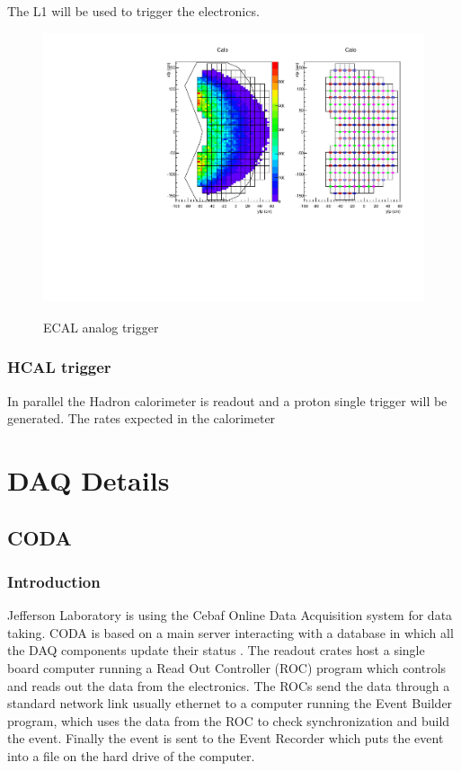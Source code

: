 \documentclass{article}
\begin{document}
The L1 will be used to trigger the  electronics.

\begin{figure}
  \centering
  \includegraphics[width=\textwidth]{figs/cfpa.pdf}\\
  \caption{ECAL analog trigger }\label{fig:ECALTrig}
\end{figure}

\subsubsection{HCAL trigger}
\label{sec:hcal-trig}

In parallel the Hadron calorimeter is readout and a proton single trigger will be generated.
The rates expected in the calorimeter

\newpage

\section{DAQ Details}
\subsection{CODA}
\subsubsection{Introduction}
Jefferson Laboratory is using the Cebaf Online Data Acquisition system for data taking.
CODA is based on a main server interacting with a database in which all the DAQ components update their status . The readout crates host a single board computer running a Read Out Controller (ROC) program which controls and reads out the data from the electronics. The ROCs send the data through a standard network link usually ethernet to a computer running the Event Builder program, which uses the data from the ROC to check synchronization and build the event. Finally the event is sent to the Event Recorder which puts the event into a file on the hard drive of the computer.
\end{document}
